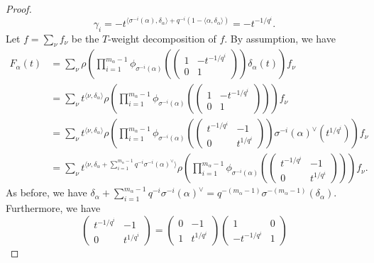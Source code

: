 \documentclass[11pt]{amsart}
\numberwithin{equation}{section}
\theoremstyle{definition}
\theoremstyle{remark}
\begin{document}
\begin{proof}
\begin{equation}
\gamma_i=-t^{\langle \sigma^{-i}(\alpha), \delta_\alpha\rangle+q^{-i}(1-\langle \alpha,\delta_\alpha\rangle)}=-t^{-1/q^i}.
\end{equation}
Let $f=\sum_\nu f_\nu$ be the $T$-weight decomposition of $f$. By assumption, we have  
\begin{align*}
    F_\alpha(t)&=\sum_{\nu}\rho \left( \prod_{i=1}^{m_{\alpha}-1} \phi_{\sigma^{-i}(\alpha)} 
 \left( \begin{pmatrix}
1&-t^{-1/q^i}\\0&1
\end{pmatrix} \right) \delta_\alpha(t) \right) f_\nu \\ &=  \sum_{\nu} t^{\langle \nu, \delta_\alpha \rangle}\rho \left( \prod_{i=1}^{m_{\alpha}-1} \phi_{\sigma^{-i}(\alpha)} 
 \left( \begin{pmatrix}
1&-t^{-1/q^i}\\0&1
\end{pmatrix} \right) \right) f_\nu
\\ &=  \sum_{\nu} t^{\langle \nu, \delta_\alpha \rangle}\rho \left( \prod_{i=1}^{m_{\alpha}-1} \phi_{\sigma^{-i}(\alpha)} 
 \left( \begin{pmatrix}
t^{-1/q^i}&-1\\0&t^{1/q^i}
\end{pmatrix} \right) \sigma^{-i}(\alpha)^\vee(t^{1/q^i}) \right) f_\nu\\
 &=  \sum_{\nu} t^{\langle \nu, \delta_\alpha +\sum_{i=1}^{m_\alpha-1} q^{-i}\sigma^{-i}(\alpha)^{\vee} \rangle}\rho \left( \prod_{i=1}^{m_{\alpha}-1} \phi_{\sigma^{-i}(\alpha)} 
 \left( \begin{pmatrix}
t^{-1/q^i}&-1\\0&t^{1/q^i}
\end{pmatrix} \right)\right) f_\nu.
\end{align*}
As before, we have $\delta_\alpha+\sum_{i=1}^{m_\alpha-1} q^{-i}\sigma^{-i}(\alpha)^{\vee}=q^{-(m_\alpha-1)}\sigma^{-(m_\alpha-1)}(\delta_\alpha)$. Furthermore, we have
\begin{equation}
 \begin{pmatrix}
t^{-1/q^i}&-1\\0&t^{1/q^i}
\end{pmatrix} =  \begin{pmatrix}
0&-1\\1&t^{1/q^i}
\end{pmatrix}  \begin{pmatrix}
1&0\\-t^{-1/q^i}&1

\end{pmatrix}
\end{equation}
\end{proof}
\end{document}
